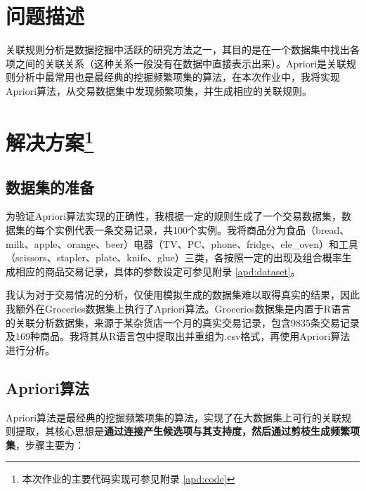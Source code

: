 \documentclass[12pt,a4paper]{article}
\theoremstyle{definition}
\begin{document}
\noindent
\noindent{}

\section{问题描述}

关联规则分析是数据挖掘中活跃的研究方法之一，其目的是在一个数据集中找出各项之间的关联关系（这种关系一般没有在数据中直接表示出来）。Apriori是关联规则分析中最常用也是最经典的挖掘频繁项集的算法，在本次作业中，我将实现Apriori算法，从交易数据集中发现频繁项集，并生成相应的关联规则。

\section{解决方案\protect\footnote{本次作业的主要代码实现可参见附录 \ref{apd:code}}}

\subsection{数据集的准备}

为验证Apriori算法实现的正确性，我根据一定的规则生成了一个交易数据集，数据集的每个实例代表一条交易记录，共100个实例。我将商品分为食品（bread、milk、apple、orange、beer）电器（TV、PC、phone、fridge、ele\_oven）和工具（scissors、stapler、plate、knife、glue）三类，各按照一定的出现及组合概率生成相应的商品交易记录，具体的参数设定可参见附录 \ref{apd:dataset}。

\vspace{0.01\linewidth}
我认为对于交易情况的分析，仅使用模拟生成的数据集难以取得真实的结果，因此我额外在Groceries数据集上执行了Apriori算法。Groceries数据集是内置于R语言的关联分析数据集，来源于某杂货店一个月的真实交易记录，包含9835条交易记录及169种商品。我将其从R语言包中提取出并重组为.csv格式，再使用Apriori算法进行分析。

\subsection{Apriori算法}

Apriori算法是最经典的挖掘频繁项集的算法，实现了在大数据集上可行的关联规则提取，其核心思想是\textbf{通过连接产生候选项与其支持度，然后通过剪枝生成频繁项集}，步骤主要为：
\end{document}

